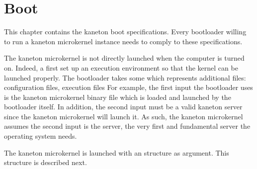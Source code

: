 %
%
%
%
%
%

%
%

\chapter{Boot}
\label{chapter:label}

This chapter contains the kaneton boot specifications. Every bootloader
willing to run a kaneton microkernel instance needs to comply to these
specifications.

\newpage

%
%

The kaneton microkernel is not directly launched when the computer is
turned on. Indeed, a  first set up an execution environment
so that the kernel can be launched properly. The bootloader takes some
 which represents additional files: configuration files,
execution files \etc{} For example, the first input the bootloader uses is
the kaneton microkernel binary file which is loaded and launched by the
bootloader itself. In addition, the second input must be a valid kaneton
server since the kaneton microkernel will launch it. As such, the kaneton
microkernel assumes the second input is the  server, the
very first and fundamental server the operating system needs.

The kaneton microkernel is launched with an  structure
as argument. This structure is described next.

